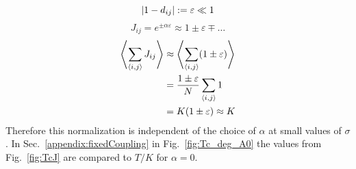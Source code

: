        \begin{equation}
            \left\vert1-d_{ij}\right\vert := \varepsilon \ll 1
        \end{equation}
        \begin{equation}
            J_{ij} = e^{\pm \alpha \varepsilon} \approx 1 \pm \varepsilon \mp \dots
        \end{equation}
        \begin{align}
            \left< \sum_{\left< i,j \right>} J_{ij} \right> &\approx \left< \sum_{\left< i,j \right>} (1 \pm \varepsilon) \right> \\
                                          &= \frac{1 \pm \varepsilon}{N} \sum_{\left< i,j \right>} 1 \\
                                          &= K(1 \pm \varepsilon) \approx K
        \end{align}
        Therefore this normalization is independent of the choice of \(\alpha\)
        at small values of \(\sigma\). In Sec.\ \ref{appendix:fixedCoupling}
        in Fig.\ \ref{fig:Tc_deg_A0}
        the values from Fig.\ \ref{fig:TcJ}
        are compared to \(T / K\) for \(\alpha = 0\).

